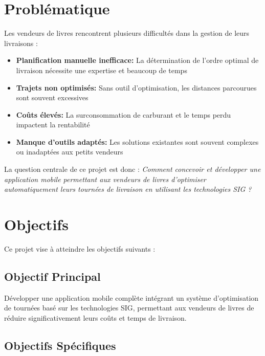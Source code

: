 \documentclass[12pt,a4paper]{report}
\begin{document}
\section{Problématique}

Les vendeurs de livres rencontrent plusieurs difficultés dans la gestion de leurs livraisons :

\begin{itemize}
    \item \textbf{Planification manuelle inefficace:} La détermination de l'ordre optimal de livraison nécessite une expertise et beaucoup de temps
    \item \textbf{Trajets non optimisés:} Sans outil d'optimisation, les distances parcourues sont souvent excessives
    \item \textbf{Coûts élevés:} La surconsommation de carburant et le temps perdu impactent la rentabilité
    \item \textbf{Manque d'outils adaptés:} Les solutions existantes sont souvent complexes ou inadaptées aux petits vendeurs
\end{itemize}

La question centrale de ce projet est donc : \textit{Comment concevoir et développer une application mobile permettant aux vendeurs de livres d'optimiser automatiquement leurs tournées de livraison en utilisant les technologies SIG ?}

\section{Objectifs}

Ce projet vise à atteindre les objectifs suivants :

\subsection{Objectif Principal}

Développer une application mobile complète intégrant un système d'optimisation de tournées basé sur les technologies SIG, permettant aux vendeurs de livres de réduire significativement leurs coûts et temps de livraison.

\subsection{Objectifs Spécifiques}
\end{document}
